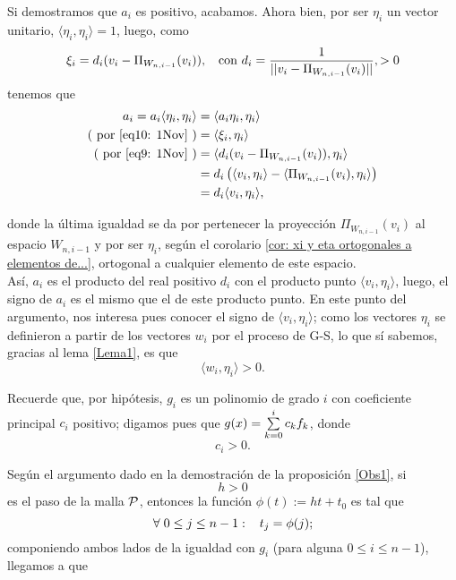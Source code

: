 \begin{itemize}
Si demostramos que $a_{i}$ es positivo, acabamos.
Ahora bien, por ser $\eta_{i}$ un vector unitario,
$\langle\eta_{i} , \eta_{i} \rangle =1$, luego,
como 
\begin{equation}
\label{eq9: 1Nov}
\xi_{i}= d_{i} (v_{i}-\Pi_{W_{n,i-1}}(v_{i})),
\hspace{0.2cm} \text{ con } d_{i}= \frac{1}{||v_{i}-\Pi_{W_{n,i-1}}(v_{i})||},
>0
\end{equation}
tenemos que
\begin{align*}
a_{i} =  a_{i} \langle\eta_{i} , \eta_{i} \rangle &
= \langle a_{i}\eta_{i} , \eta_{i} \rangle \\
(\text{ por \eqref{eq10: 1Nov} }) & = 
\langle \xi_{i} , \eta_{i} \rangle \\
(\text{ por \eqref{eq9: 1Nov} }) & =  
\langle  d_{i} (v_{i}-\Pi_{W_{n,i-1}}(v_{i})), \eta_{i} \rangle \\
& =  d_{i} \left( \langle  v_{i} , \eta_{i} \rangle -
\langle \Pi_{W_{n,i-1}}(v_{i}) , \eta_{i} \rangle  \right) \\
& = d_{i} \langle  v_{i} , \eta_{i} \rangle,
\end{align*}

donde la última igualdad se da por pertenecer la proyección
$\Pi_{W_{n,i-1}}(v_{i})$ al espacio $W_{n,i-1}$ y por ser
$\eta_{i}$,
según el corolario \ref{cor: xi y eta ortogonales a elementos de...},
ortogonal a cualquier elemento de este espacio. \\

Así, $a_{i}$ es el producto del 
real positivo $d_{i}$
con el producto punto
$\langle  v_{i} , \eta_{i} \rangle$,
luego, el signo de $a_{i}$ es el mismo que el de este 
producto punto. 
En este punto del argumento,
nos interesa pues conocer el signo de
$\langle  v_{i} , \eta_{i} \rangle$; como los vectores $\eta_{i}$
se definieron a partir de los vectores $w_{i}$ por el 
proceso de G-S, lo que sí sabemos, gracias al lema
\ref{Lema1}, es que 
\begin{equation}
\label{eq1: 1Nov}
\langle  w_{i} , \eta_{i} \rangle >0.
\end{equation}

Recuerde que, por hipótesis,
$g_{i}$ es un polinomio de grado $i$
con coeficiente principal $c_{i}$ positivo; digamos pues que
$g(x)= \sum\limits_{k=0}^{i}c_{k}f_{k}$,
donde 
\begin{equation}
\label{eq2: 1Nov}
c_{i}>0.
\end{equation}

Según el argumento dado en la demostración de 
la proposición \ref{Obs1}, si 
\begin{equation}
\label{eq3: 1Nov}
h>0
\end{equation} es el paso
de la malla $\mathcal{P}$, entonces la función
$\phi(t):= ht+t_{0}$ es tal que
\[
\forall \hspace{0.1cm} 0 \leq j \leq n-1: \hspace{0.3cm} t_{j}= \phi(j);
\]
componiendo ambos lados de la igualdad con $g_{i}$
(para alguna $0 \leq i \leq n-1$), llegamos a que


\end{itemize}
